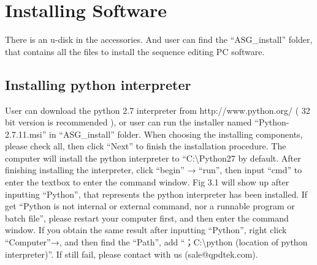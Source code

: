 \pagestyle{fancy}
\chapter{\heiti Installing Software}
\setmainfont{Times New Roman}
There is an u-disk in the accessories. And user can find the “ASG\_install” folder, that contains all the files to install the sequence editing PC software. 

\section{\heiti Installing python interpreter}
User can download the python 2.7 interpreter from http://www.python.org/ ( 32 bit version is recommended ), or user can run the installer named “Python-2.7.11.msi” in “ASG\_install” folder. When choosing the installing components, please check all,  then click “Next” to finish the installation procedure. The computer will install the python interpreter to “C:\textbackslash Python27 by default. After finishing installing the interpreter, click “begin” → “run”, then input “cmd” to enter the textbox to enter the command window. Fig 3.1 will show up after inputting “Python”, that represents the python interpreter has been installed. If get “Python is not internal or external command, nor a runnable program or batch file”, please restart your computer first, and then enter the command window. If you obtain the same result after inputting “Python”, right click “Computer”→, and then find the “Path”, add “；C:\textbackslash python (location of python interpreter)”. If still fail, please contact with us (sale@qpdtek.com).

